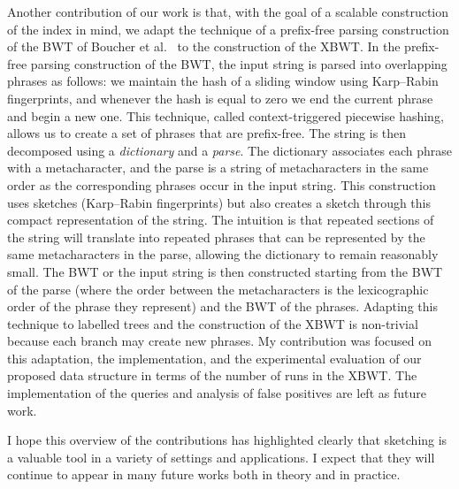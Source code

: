 Another contribution of our work is that, with the goal of a scalable construction of the index in mind, we adapt the technique of a prefix-free parsing construction of the BWT of Boucher et al.~\cite{boucher2019prefix} to the construction of the XBWT. 
In the prefix-free parsing construction of the BWT, the input string is parsed into overlapping phrases as follows: we maintain the hash of a sliding window using Karp--Rabin fingerprints, and whenever the hash is equal to zero we end the current phrase and begin a new one. This technique, called context-triggered piecewise hashing, allows us to create a set of phrases that are prefix-free.
The string is then decomposed using a \emph{dictionary} and a \emph{parse}. 
The dictionary associates each phrase with a metacharacter, and the parse is a string of metacharacters in the same order as the corresponding phrases occur in the input string.
This construction uses sketches (Karp--Rabin fingerprints) but also creates a sketch through this compact representation of the string.
The intuition is that repeated sections of the string will translate into repeated phrases that can be represented by the same metacharacters in the parse, allowing the dictionary to remain reasonably small.
The BWT or the input string is then constructed starting from the BWT of the parse (where the order between the metacharacters is the lexicographic order of the phrase they represent) and the BWT of the phrases.
Adapting this technique to labelled trees and the construction of the XBWT is non-trivial because each branch may create new phrases. My contribution was focused on this adaptation, the implementation, and the experimental evaluation of our proposed data structure in terms of the number of runs in the XBWT. The implementation of the queries and analysis of false positives are left as future work.


I hope this overview of the contributions has highlighted clearly that sketching is a valuable tool in a variety of settings and applications. I expect that they will continue to appear in many future works both in theory and in practice.